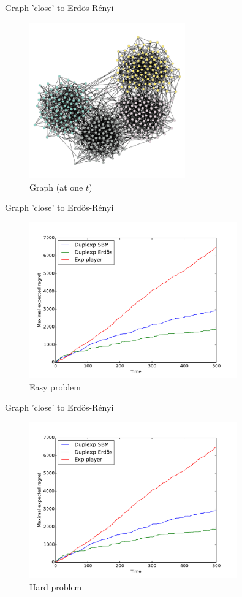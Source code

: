 \documentclass[11pt]{beamer}
\begin{document}
\begin{frame}{Graph 'close' to Erdös-Rényi}

\begin{figure}[ht]
	\centering
	\includegraphics[width=0.6\textwidth]{blockmodel_unsuccess}
	\caption{Graph (at one $t$)}
	\label{fig:easy}
\end{figure}
\end{frame}

\begin{frame}{Graph 'close' to Erdös-Rényi}

\begin{figure}[ht]
	\centering
	\includegraphics[width=0.8\textwidth]{regret_unsuccess_easy}
	\caption{Easy problem}
	\label{fig:easy}
\end{figure}
\end{frame}

\begin{frame}{Graph 'close' to Erdös-Rényi}
\begin{figure}[ht]
	\centering
	\includegraphics[width=0.8\textwidth]{regret_unsuccess_easy}
	\caption{Hard problem}
	\label{fig:easy}
\end{figure}
\end{frame}
\end{document}
